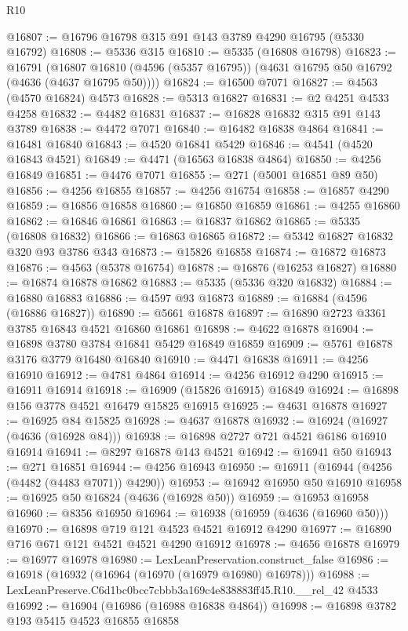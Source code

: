 \begin{lexlean}{R10}
\begin{coremodule}
@16807 := @16796 @16798 @315 @91 @143 @3789 @4290 @16795 (@5330 @16792)
@16808 := @5336 @315
@16810 := @5335 (@16808 @16798)
@16823 := @16791
    (@16807 @16810 (@4596 (@5357 @16795)) (@4631 @16795 @50 @16792 (@4636 (@4637 @16795 @50))))
@16824 := @16500 @7071
@16827 := @4563 (@4570 @16824) @4573
@16828 := @5313 @16827
@16831 := @2 @4251 @4533 @4258
@16832 := @4482 @16831
@16837 := @16828 @16832 @315 @91 @143 @3789
@16838 := @4472 @7071
@16840 := @16482 @16838 @4864
@16841 := @16481 @16840
@16843 := @4520 @16841 @5429
@16846 := @4541 (@4520 @16843 @4521)
@16849 := @4471 (@16563 @16838 @4864)
@16850 := @4256 @16849
@16851 := @4476 @7071
@16855 := @271 (@5001 @16851 @89 @50)
@16856 := @4256 @16855
@16857 := @4256 @16754
@16858 := @16857 @4290
@16859 := @16856 @16858
@16860 := @16850 @16859
@16861 := @4255 @16860
@16862 := @16846 @16861
@16863 := @16837 @16862
@16865 := @5335 (@16808 @16832)
@16866 := @16863 @16865
@16872 := @5342 @16827 @16832 @320 @93 @3786 @343
@16873 := @15826 @16858
@16874 := @16872 @16873
@16876 := @4563 (@5378 @16754)
@16878 := @16876 (@16253 @16827)
@16880 := @16874 @16878 @16862
@16883 := @5335 (@5336 @320 @16832)
@16884 := @16880 @16883
@16886 := @4597 @93 @16873
@16889 := @16884 (@4596 (@16886 @16827))
@16890 := @5661 @16878
@16897 := @16890 @2723 @3361 @3785 @16843 @4521 @16860 @16861
@16898 := @4622 @16878
@16904 := @16898 @3780 @3784 @16841 @5429 @16849 @16859
@16909 := @5761 @16878 @3176 @3779 @16480 @16840
@16910 := @4471 @16838
@16911 := @4256 @16910
@16912 := @4781 @4864
@16914 := @4256 @16912 @4290
@16915 := @16911 @16914
@16918 := @16909 (@15826 @16915) @16849
@16924 := @16898 @156 @3778 @4521 @16479 @15825 @16915
@16925 := @4631 @16878
@16927 := @16925 @84 @15825
@16928 := @4637 @16878
@16932 := @16924 (@16927 (@4636 (@16928 @84)))
@16938 := @16898 @2727 @721 @4521 @6186 @16910 @16914
@16941 := @8297 @16878 @143 @4521
@16942 := @16941 @50
@16943 := @271 @16851
@16944 := @4256 @16943
@16950 := @16911 (@16944 (@4256 (@4482 (@4483 @7071)) @4290))
@16953 := @16942 @16950 @50 @16910
@16958 := @16925 @50 @16824 (@4636 (@16928 @50))
@16959 := @16953 @16958
@16960 := @8356 @16950
@16964 := @16938 (@16959 (@4636 (@16960 @50)))
@16970 := @16898 @719 @121 @4523 @4521 @16912 @4290
@16977 := @16890 @716 @671 @121 @4521 @4521 @4290 @16912
@16978 := @4656 @16878
@16979 := @16977 @16978
@16980 := LexLeanPreservation.construct_false
@16986 := @16918 (@16932 (@16964 (@16970 (@16979 @16980) @16978)))
@16988 := LexLeanPreserve.C6d1bc0bcc7cbbb3a169c4e838883ff45.R10.__rel_42 @4533
@16992 := @16904 (@16986 (@16988 @16838 @4864))
@16998 := @16898 @3782 @193 @5415 @4523 @16855 @16858

\end{coremodule}
\end{lexlean}
